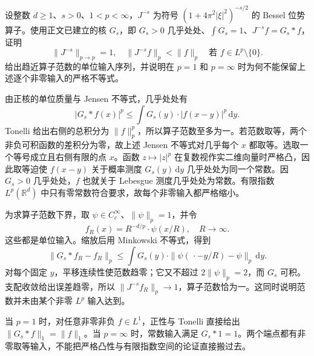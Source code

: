 \begin{exercise}\label{b2:ex:22-new-8}
设整数 \(d\geq1\)、\(s>0\)、\(1<p<\infty\)，\(J^{-s}\) 为符号 \((1+4\pi^2|\xi|^2)^{-s/2}\) 的 Bessel 位势算子。使用正文已建立的核 \(G_s\)，即
\(G_s>0\) 几乎处处、\(\int G_s=1\)、\(J^{-s}f=G_s*f\)，证明
\[
 \|J^{-s}\|_{p\to p}=1,
 \quad
 \|J^{-s}f\|_p<\|f\|_p
 \quad\text{若 }f\in L^p\setminus\{0\}.
\]
给出趋近算子范数的单位输入序列，并说明在 \(p=1\) 和 \(p=\infty\) 时为何不能保留上述逐个非零输入的严格不等式。
\end{exercise}
\begin{solution}
由正核的单位质量与 Jensen 不等式，几乎处处有
\[
 |G_s*f(x)|^p
 \leq\int G_s(y)\cdot|f(x-y)|^p\,\mathrm dy.
\]
Tonelli 给出右侧的总积分为 \(\|f\|_p^p\)，所以算子范数至多为一。若范数取等，两个非负可积函数的差积分为零，故上述 Jensen 不等式对几乎每个 \(x\) 都取等。选取一个等号成立且右侧有限的点 \(x\)。函数 \(z\mapsto|z|^p\) 在复数视作实二维向量时严格凸，因此取等迫使 \(f(x-y)\) 关于概率测度 \(G_s(y)\,\mathrm dy\) 几乎处处为同一个常数。因 \(G_s>0\) 几乎处处，\(f\) 也就关于 Lebesgue 测度几乎处处为常数。有限指数 \(L^p(\mathbb R^d)\) 中只有零常数符合要求，故每个非零输入都严格缩小。

为求算子范数下界，取 \(\psi\in C_c^\infty\)、\(\|\psi\|_p=1\)，并令
\[
 f_R(x)=R^{-d/p}\cdot\psi(x/R),\quad R\longrightarrow\infty.
\]
这些都是单位输入。缩放后用 Minkowski 不等式，得到
\[
 \|G_s*f_R-f_R\|_p
 \leq\int G_s(y)\cdot
                 \|\psi(\,\cdot-y/R)-\psi\|_p\,\mathrm dy.
\]
对每个固定 \(y\)，平移连续性使范数趋零；它又不超过 \(2\|\psi\|_p=2\)，而 \(G_s\) 可积。支配收敛给出误差趋零，所以
\(\|J^{-s}f_R\|_p\to1\)，算子范数恰为一。这同时说明范数并未由某个非零 \(L^p\) 输入达到。

当 \(p=1\) 时，对任意非零非负 \(f\in L^1\)，正性与 Tonelli 直接给出
\(\|G_s*f\|_1=\|f\|_1\)。当 \(p=\infty\) 时，常数输入满足 \(G_s*1=1\)。两个端点都有非零取等输入，不能把严格凸性与有限指数空间的论证直接搬过去。
\end{solution}
